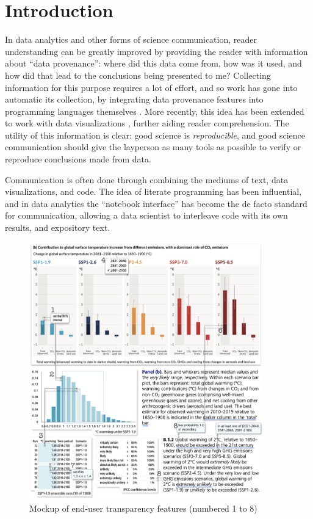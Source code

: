 \section{Introduction}

In data analytics and other forms of science communication, reader understanding can be greatly improved by
providing the reader with information about ``data provenance'': where did this data come from, how was it
used, and how did that lead to the conclusions being presented to me? Collecting information for this purpose
requires a lot of effort, and so work has gone into automatic its collection, by integrating data provenance
features into programming languages themselves \cite{fehrenbach16}. More recently, this idea has been extended
to work with data visualizations \cite{perera22}, further aiding reader comprehension. The utility of this
information is clear: good science  is \emph{reproducible}, and good science communication should give the
layperson as many tools as possible to verify or reproduce conclusions made from data.

Communication is often done through combining the mediums of text, data visualizations, and code. The idea of
literate programming \cite{knuth84} has been influential, and in data analytics the ``notebook interface''
\cite{kluyver16} has become the de facto standard for communication, allowing a data scientist to interleave
code with its own results, and expository text.

\begin{figure}[h]
   \includegraphics[width=0.9\textwidth]{fig/ipcc-mockup.png}
   \caption{Mockup of end-user transparency features (numbered 1 to 8)}
   \label{fig:ipcc-mockup}
\end{figure}

